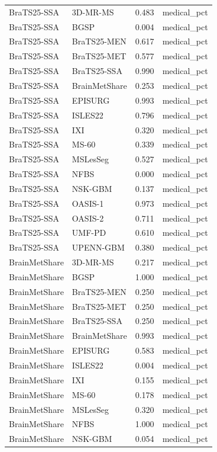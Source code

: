 \begin{tabular}{llrl}
BraTS25-SSA & 3D-MR-MS & 0.483 & medical\_pct \\
BraTS25-SSA & BGSP & 0.004 & medical\_pct \\
BraTS25-SSA & BraTS25-MEN & 0.617 & medical\_pct \\
BraTS25-SSA & BraTS25-MET & 0.577 & medical\_pct \\
BraTS25-SSA & BraTS25-SSA & 0.990 & medical\_pct \\
BraTS25-SSA & BrainMetShare & 0.253 & medical\_pct \\
BraTS25-SSA & EPISURG & 0.993 & medical\_pct \\
BraTS25-SSA & ISLES22 & 0.796 & medical\_pct \\
BraTS25-SSA & IXI & 0.320 & medical\_pct \\
BraTS25-SSA & MS-60 & 0.339 & medical\_pct \\
BraTS25-SSA & MSLesSeg & 0.527 & medical\_pct \\
BraTS25-SSA & NFBS & 0.000 & medical\_pct \\
BraTS25-SSA & NSK-GBM & 0.137 & medical\_pct \\
BraTS25-SSA & OASIS-1 & 0.973 & medical\_pct \\
BraTS25-SSA & OASIS-2 & 0.711 & medical\_pct \\
BraTS25-SSA & UMF-PD & 0.610 & medical\_pct \\
BraTS25-SSA & UPENN-GBM & 0.380 & medical\_pct \\
BrainMetShare & 3D-MR-MS & 0.217 & medical\_pct \\
BrainMetShare & BGSP & 1.000 & medical\_pct \\
BrainMetShare & BraTS25-MEN & 0.250 & medical\_pct \\
BrainMetShare & BraTS25-MET & 0.250 & medical\_pct \\
BrainMetShare & BraTS25-SSA & 0.250 & medical\_pct \\
BrainMetShare & BrainMetShare & 0.993 & medical\_pct \\
BrainMetShare & EPISURG & 0.583 & medical\_pct \\
BrainMetShare & ISLES22 & 0.004 & medical\_pct \\
BrainMetShare & IXI & 0.155 & medical\_pct \\
BrainMetShare & MS-60 & 0.178 & medical\_pct \\
BrainMetShare & MSLesSeg & 0.320 & medical\_pct \\
BrainMetShare & NFBS & 1.000 & medical\_pct \\
BrainMetShare & NSK-GBM & 0.054 & medical\_pct \\

\end{tabular}
